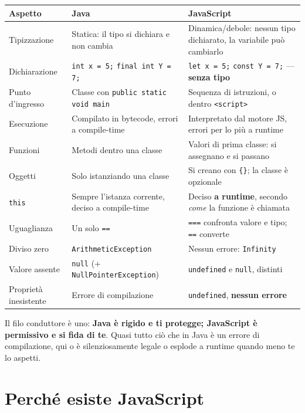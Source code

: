\documentclass[10pt,a4paper]{article}
\begin{document}
\begin{center}
\small
\begin{tabularx}{\textwidth}{@{}lXX@{}}
\toprule
\textbf{Aspetto} & \textbf{Java} & \textbf{JavaScript} \\
\midrule
Tipizzazione & Statica: il tipo si dichiara e non cambia & Dinamica/debole: nessun tipo dichiarato, la variabile può cambiarlo \\
Dichiarazione & \texttt{int x = 5;} \newline \texttt{final int Y = 7;} & \texttt{let x = 5;} \newline \texttt{const Y = 7;} --- \textbf{senza tipo} \\
Punto d'ingresso & Classe con \texttt{public static void main} & Sequenza di istruzioni, o dentro \texttt{<script>} \\
Esecuzione & Compilato in bytecode, errori a compile-time & Interpretato dal motore JS, errori per lo più a runtime \\
Funzioni & Metodi dentro una classe & Valori di prima classe: si assegnano e si passano \\
Oggetti & Solo istanziando una classe & Si creano con \texttt{\{\}}; la classe è opzionale \\
\texttt{this} & Sempre l'istanza corrente, deciso a compile-time & Deciso \textbf{a runtime}, secondo \emph{come} la funzione è chiamata \\
Uguaglianza & Un solo \texttt{==} & \texttt{===} confronta valore e tipo; \texttt{==} converte \\
Diviso zero & \texttt{ArithmeticException} & Nessun errore: \texttt{Infinity} \\
Valore assente & \texttt{null} (+ \texttt{NullPointerException}) & \texttt{undefined} e \texttt{null}, distinti \\
Proprietà inesistente & Errore di compilazione & \texttt{undefined}, \textbf{nessun errore} \\
\bottomrule
\end{tabularx}
\end{center}

Il filo conduttore è uno: \textbf{Java è rigido e ti protegge; JavaScript è permissivo e si fida di te}. Quasi tutto ciò che in Java è un errore di compilazione, qui o è silenziosamente legale o esplode a runtime quando meno te lo aspetti.

\section{Perché esiste JavaScript}
\end{document}
